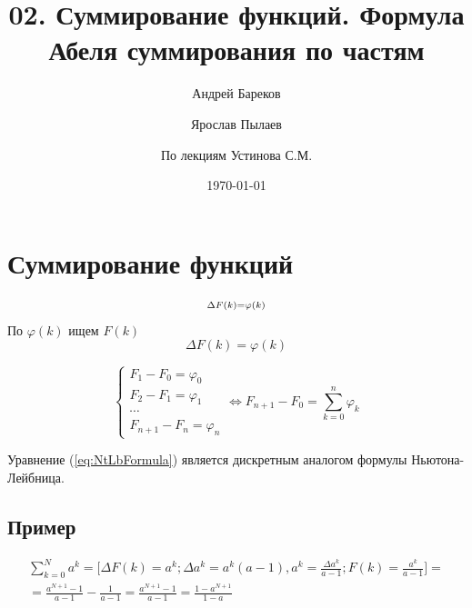 \documentclass[a4paper,11pt]{article}
\title{02. Суммирование функций. Формула Абеля суммирования по частям}
\author{Андрей Бареков \and Ярослав Пылаев \and По лекциям Устинова С.М.}
\date{\today}
\begin{document}
\maketitle
\newpage

\section{Суммирование функций}
\marginpar
{
  \begin{gather*}
    \begin{subarray}{1}
      \Delta F(k)= \varphi (k) \\
    \end{subarray}
  \end{gather*}
  \footnotesize По $\varphi (k)$ ищем $F(k)$
}
\begin{equation}
  \Delta F(k) = \varphi(k)
\end{equation}

\begin{equation}
  \begin{cases}
    F_1 - F_0 = \varphi_0 \\
    F_2 - F_1 = \varphi_1 \\
    \cdots \\
    F_{n+1} - F_n = \varphi_n
  \end{cases} \Leftrightarrow F_{n+1} - F_0 = \sum_{k=0}^{n} \varphi_k
  \label{eq:NtLbFormula}
\end{equation}

Уравнение (\ref{eq:NtLbFormula}) является дискретным аналогом формулы Ньютона-Лейбница.
\subsection{Пример}
\begin{equation*}
  \begin{split}
    \sum_{k=0}^{N} a^k = \bigg[ \Delta F(k) = a^k; \Delta a^k = a^k(a-1), a^k = \frac{\Delta a^k}{a-1}; F(k) = \frac{a^k}{a-1} \bigg] = \\
    = \frac{a^{N+1}-1}{a-1} - \frac{1}{a-1} = \frac{a^{N+1}-1}{a-1} = \frac{1-a^{N+1}}{1-a}
  \end{split}
\end{equation*}
\end{document}
